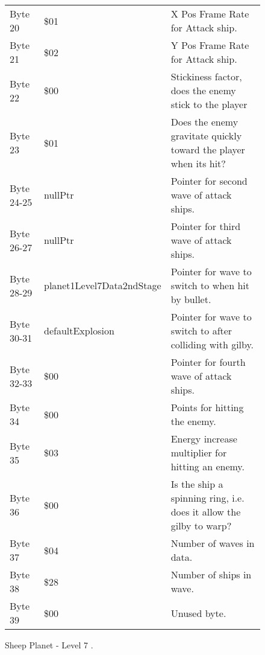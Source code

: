 \begin{figure}[H]
{\begin{adjustbox}{width=12cm}
\begin{tabular}{lll}
 Byte 20    & \$01                       & X Pos Frame Rate for Attack ship.                                   \\
 Byte 21    & \$02                       & Y Pos Frame Rate for Attack ship.                                   \\
 Byte 22    & \$00                       & Stickiness factor, does the enemy stick to the player               \\
 Byte 23    & \$01                       & Does the enemy gravitate quickly toward the player when its hit?    \\
 Byte 24-25 & nullPtr                   & Pointer for second wave of attack ships.                            \\
 Byte 26-27 & nullPtr                   & Pointer for third wave of attack ships.                             \\
 Byte 28-29 & planet1Level7Data2ndStage & Pointer for wave to switch to when hit by bullet.                   \\
 Byte 30-31 & defaultExplosion          & Pointer for  wave to switch to after colliding with gilby.          \\
 Byte 32-33 & \$00                       & Pointer for fourth wave of attack ships.                            \\
 Byte 34    & \$00                       & Points for hitting the enemy.                                       \\
 Byte 35    & \$03                       & Energy increase multiplier for hitting an enemy.                    \\
 Byte 36    & \$00                       & Is the ship a spinning ring, i.e. does it allow the gilby to warp?  \\
 Byte 37    & \$04                       & Number of waves in data.                                            \\
 Byte 38    & \$28                       & Number of ships in wave.                                            \\
 Byte 39    & \$00                       & Unused byte.                                                        \\
\bottomrule
\end{tabular}

  \end{adjustbox}

  }\caption*{Sheep Planet - Level 7
.}
\end{figure}

